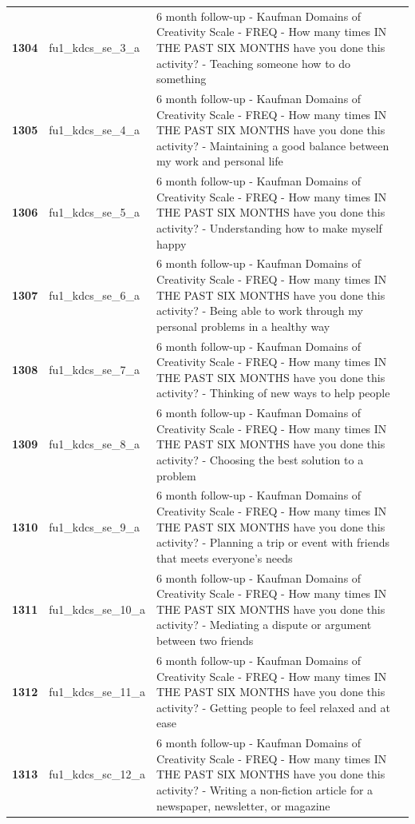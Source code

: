 \documentclass[
  letterpaper,
  DIV=11,
  numbers=noendperiod]{scrartcl}
\begin{document}
\begin{longtable}[t]{>{}cll}
\textbf{1304} & fu1\_kdcs\_se\_3\_a & 6 month follow-up - Kaufman Domains of Creativity Scale - FREQ - How many times IN THE PAST SIX MONTHS have you done this activity? - Teaching someone how to do something\\
\textbf{1305} & fu1\_kdcs\_se\_4\_a & 6 month follow-up - Kaufman Domains of Creativity Scale - FREQ - How many times IN THE PAST SIX MONTHS have you done this activity? - Maintaining a good balance between my work and personal life\\
\addlinespace
\textbf{1306} & fu1\_kdcs\_se\_5\_a & 6 month follow-up - Kaufman Domains of Creativity Scale - FREQ - How many times IN THE PAST SIX MONTHS have you done this activity? - Understanding how to make myself happy\\
\textbf{1307} & fu1\_kdcs\_se\_6\_a & 6 month follow-up - Kaufman Domains of Creativity Scale - FREQ - How many times IN THE PAST SIX MONTHS have you done this activity? - Being able to work through my personal problems in a healthy way\\
\textbf{1308} & fu1\_kdcs\_se\_7\_a & 6 month follow-up - Kaufman Domains of Creativity Scale - FREQ - How many times IN THE PAST SIX MONTHS have you done this activity? - Thinking of new ways to help people\\
\textbf{1309} & fu1\_kdcs\_se\_8\_a & 6 month follow-up - Kaufman Domains of Creativity Scale - FREQ - How many times IN THE PAST SIX MONTHS have you done this activity? - Choosing the best solution to a problem\\
\textbf{1310} & fu1\_kdcs\_se\_9\_a & 6 month follow-up - Kaufman Domains of Creativity Scale - FREQ - How many times IN THE PAST SIX MONTHS have you done this activity? - Planning a trip or event with friends that meets everyone's needs\\
\addlinespace
\textbf{1311} & fu1\_kdcs\_se\_10\_a & 6 month follow-up - Kaufman Domains of Creativity Scale - FREQ - How many times IN THE PAST SIX MONTHS have you done this activity? - Mediating a dispute or argument between two friends\\
\textbf{1312} & fu1\_kdcs\_se\_11\_a & 6 month follow-up - Kaufman Domains of Creativity Scale - FREQ - How many times IN THE PAST SIX MONTHS have you done this activity? - Getting people to feel relaxed and at ease\\
\textbf{1313} & fu1\_kdcs\_sc\_12\_a & 6 month follow-up - Kaufman Domains of Creativity Scale - FREQ - How many times IN THE PAST SIX MONTHS have you done this activity? - Writing a non-fiction article for a newspaper, newsletter, or magazine\\

\end{longtable}
\end{document}
